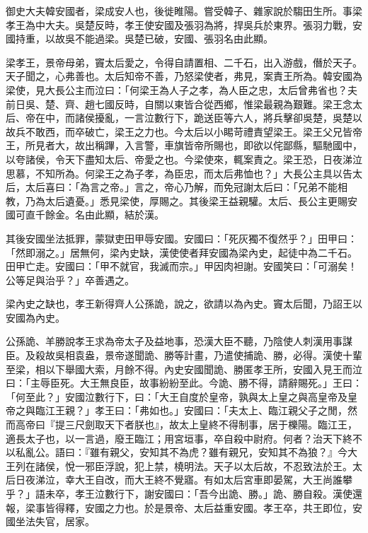 
\begin{pinyinscope}
御史大夫韓安國者，梁成安人也，後徙睢陽。嘗受韓子、雜家說於騶田生所。事梁孝王為中大夫。吳楚反時，孝王使安國及張羽為將，捍吳兵於東界。張羽力戰，安國持重，以故吳不能過梁。吳楚已破，安國、張羽名由此顯。

梁孝王，景帝母弟，竇太后愛之，令得自請置相、二千石，出入游戲，僭於天子。天子聞之，心弗善也。太后知帝不善，乃怒梁使者，弗見，案責王所為。韓安國為梁使，見大長公主而泣曰：「何梁王為人子之孝，為人臣之忠，太后曾弗省也？夫前日吳、楚、齊、趙七國反時，自關以東皆合從西鄉，惟梁最親為艱難。梁王念太后、帝在中，而諸侯擾亂，一言泣數行下，跪送臣等六人，將兵擊卻吳楚，吳楚以故兵不敢西，而卒破亡，梁王之力也。今太后以小睗苛禮責望梁王。梁王父兄皆帝王，所見者大，故出稱蹕，入言警，車旗皆帝所賜也，即欲以侘鄙縣，驅馳國中，以夸諸侯，令天下盡知太后、帝愛之也。今梁使來，輒案責之。梁王恐，日夜涕泣思慕，不知所為。何梁王之為子孝，為臣忠，而太后弗恤也？」大長公主具以告太后，太后喜曰：「為言之帝。」言之，帝心乃解，而免冠謝太后曰：「兄弟不能相教，乃為太后遺憂。」悉見梁使，厚賜之。其後梁王益親驩。太后、長公主更賜安國可直千餘金。名由此顯，結於漢。

其後安國坐法抵罪，蒙獄吏田甲辱安國。安國曰：「死灰獨不復然乎？」田甲曰：「然即溺之。」居無何，梁內史缺，漢使使者拜安國為梁內史，起徒中為二千石。田甲亡走。安國曰：「甲不就官，我滅而宗。」甲因肉袒謝。安國笑曰：「可溺矣！公等足與治乎？」卒善遇之。

梁內史之缺也，孝王新得齊人公孫詭，說之，欲請以為內史。竇太后聞，乃詔王以安國為內史。

公孫詭、羊勝說孝王求為帝太子及益地事，恐漢大臣不聽，乃陰使人刺漢用事謀臣。及殺故吳相袁盎，景帝遂聞詭、勝等計畫，乃遣使捕詭、勝，必得。漢使十輩至梁，相以下舉國大索，月餘不得。內史安國聞詭、勝匿孝王所，安國入見王而泣曰：「主辱臣死。大王無良臣，故事紛紛至此。今詭、勝不得，請辭賜死。」王曰：「何至此？」安國泣數行下，曰：「大王自度於皇帝，孰與太上皇之與高皇帝及皇帝之與臨江王親？」孝王曰：「弗如也。」安國曰：「夫太上、臨江親父子之閒，然而高帝曰『提三尺劍取天下者朕也』，故太上皇終不得制事，居于櫟陽。臨江王，適長太子也，以一言過，廢王臨江；用宮垣事，卒自殺中尉府。何者？治天下終不以私亂公。語曰：『雖有親父，安知其不為虎？雖有親兄，安知其不為狼？』今大王列在諸侯，悅一邪臣浮說，犯上禁，橈明法。天子以太后故，不忍致法於王。太后日夜涕泣，幸大王自改，而大王終不覺寤。有如太后宮車即晏駕，大王尚誰攀乎？」語未卒，孝王泣數行下，謝安國曰：「吾今出詭、勝。」詭、勝自殺。漢使還報，梁事皆得釋，安國之力也。於是景帝、太后益重安國。孝王卒，共王即位，安國坐法失官，居家。


\end{pinyinscope}
